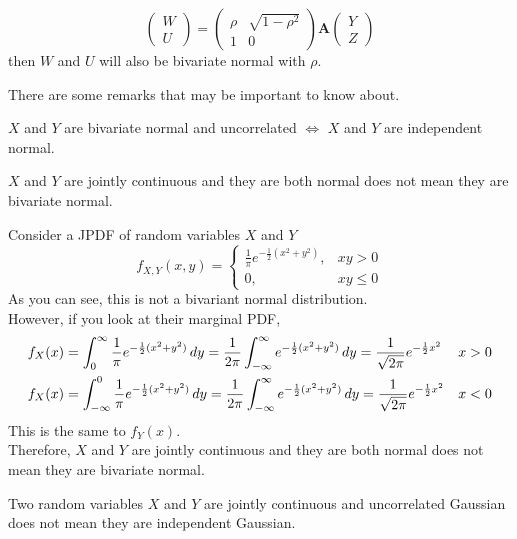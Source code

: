 \documentclass{huhtakm-template-book}
\begin{document}
\begin{eg}
	\begin{equation*}
		\begin{pmatrix}
			W\\
			U
		\end{pmatrix}=\begin{pmatrix}
			\rho & \sqrt{1-\rho^{2}}\\
			1 & 0
		\end{pmatrix}\mathbf{A}\begin{pmatrix}
			Y\\
			Z
		\end{pmatrix}
	\end{equation*}
	then $W$ and $U$ will also be bivariate normal with $\rho$.
\end{eg}
There are some remarks that may be important to know about.
\begin{rem}
	$X$ and $Y$ are bivariate normal and uncorrelated $\iff$ $X$ and $Y$ are independent normal.
\end{rem}
\begin{rem}
	$X$ and $Y$ are jointly continuous and they are both normal does not mean they are bivariate normal.
\end{rem}
\begin{eg}
	Consider a JPDF of random variables $X$ and $Y$
	\begin{equation*}
		f_{X,Y}(x,y)=\begin{cases}
			\frac{1}{\pi}e^{-\frac{1}{2}(x^{2}+y^{2})}, &xy>0\\
			0, &xy\leq 0
		\end{cases}
	\end{equation*}
	As you can see, this is not a bivariant normal distribution.\\
	However, if you look at their marginal PDF,
	\begin{align*}
		f_{X}(x)&=\int_{0}^{\infty}\frac{1}{\pi}e^{-\frac{1}{2}(x^{2}+y^{2})}\,dy=\frac{1}{2\pi}\int_{-\infty}^{\infty} e^{-\frac{1}{2}(x^{2}+y^{2})}\,dy=\frac{1}{\sqrt{2\pi}}e^{-\frac{1}{2}x^{2}} & x&>0\\
		f_{X}(x)&=\int_{-\infty}^{0}\frac{1}{\pi}e^{-\frac{1}{2}(x^{2}+y^{2})}\,dy=\frac{1}{2\pi}\int_{-\infty}^{\infty} e^{-\frac{1}{2}(x^{2}+y^{2})}\,dy=\frac{1}{\sqrt{2\pi}}e^{-\frac{1}{2}x^{2}} & x&<0
	\end{align*}
	This is the same to $f_{Y}(x)$.\\
	Therefore, $X$ and $Y$ are jointly continuous and they are both normal does not mean they are bivariate normal.
\end{eg}
\begin{rem}
	Two random variables $X$ and $Y$ are jointly continuous and uncorrelated Gaussian does not mean they are independent Gaussian.
\end{rem}
\end{document}

